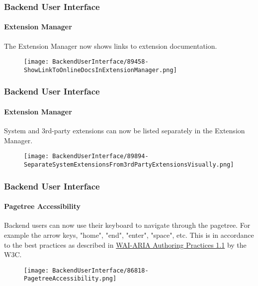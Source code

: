 
\begin{frame}[fragile]
	\frametitle{Backend User Interface}
	\framesubtitle{Extension Manager}

	The Extension Manager now shows links to extension documentation.

	\begin{figure}
		\texttt{[image: BackendUserInterface/89458-ShowLinkToOnlineDocsInExtensionManager.png]}
	\end{figure}

\end{frame}


\begin{frame}[fragile]
	\frametitle{Backend User Interface}
	\framesubtitle{Extension Manager}

	System and 3rd-party extensions can now be listed separately in the Extension Manager.

	\begin{figure}
		\texttt{[image: BackendUserInterface/89894-SeparateSystemExtensionsFrom3rdPartyExtensionsVisually.png]}
	\end{figure}

\end{frame}


\begin{frame}[fragile]
	\frametitle{Backend User Interface}
	\framesubtitle{Pagetree Accessibility}

	Backend users can now use their keyboard to navigate through the pagetree.
	For example the arrow keys, "home", "end", "enter", "space", etc.
	\newline
	This is in accordance to the best practices as described in
	\href{https://www.w3.org/TR/wai-aria-practices-1.1/#keyboard-interaction-22}{WAI-ARIA Authoring Practices 1.1}
	by the W3C.

	\begin{figure}
		\texttt{[image: BackendUserInterface/86818-PagetreeAccessibility.png]}
	\end{figure}

\end{frame}

